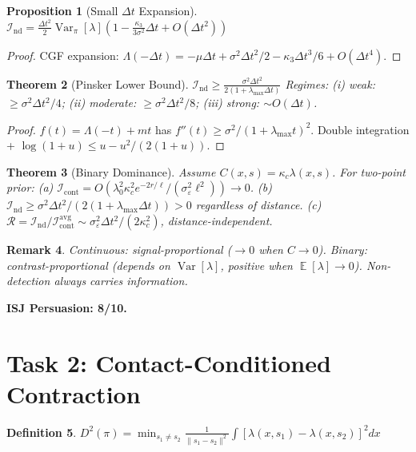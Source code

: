 \documentclass[11pt]{article}
\newtheorem{theorem}{Theorem}
\newtheorem{proposition}[theorem]{Proposition}
\newtheorem{definition}[theorem]{Definition}
\newtheorem{remark}[theorem]{Remark}
\DeclareMathOperator{\E}{\mathbb{E}}
\DeclareMathOperator{\Var}{\mathrm{Var}}
\begin{document}
\begin{proposition}[Small $\Delta t$ Expansion]\label{prop:small_dt}
$\mathcal{I}_{\mathrm{nd}}=\frac{\Delta t^2}{2}\Var_\pi[\lambda](1-\frac{\kappa_3}{3\sigma^2}\Delta t+O(\Delta t^2))$
\end{proposition}
\begin{proof}
CGF expansion: $\Lambda(-\Delta t)=-\mu\Delta t+\sigma^2\Delta t^2/2-\kappa_3\Delta t^3/6+O(\Delta t^4)$.
\end{proof}

\begin{theorem}[Pinsker Lower Bound]\label{thm:pinsker}
$\mathcal{I}_{\mathrm{nd}}\geq\frac{\sigma^2\Delta t^2}{2(1+\lambda_{\max}\Delta t)}$
Regimes: (i) weak: $\geq\sigma^2\Delta t^2/4$; (ii) moderate: $\geq\sigma^2\Delta t^2/8$; (iii) strong: $\sim O(\Delta t)$.
\end{theorem}
\begin{proof}
$f(t)=\Lambda(-t)+mt$ has $f''(t)\geq\sigma^2/(1+\lambda_{\max}t)^2$. Double integration + $\log(1+u)\leq u-u^2/(2(1+u))$.
\end{proof}

\begin{theorem}[Binary Dominance]\label{thm:binary_dominance}
Assume $C(x,s)=\kappa_c\lambda(x,s)$. For two-point prior:
(a) $\mathcal{I}_{\mathrm{cont}}=O(\lambda_0^2\kappa_c^2 e^{-2r/\ell}/(\sigma_\varepsilon^2\ell^2))\to 0$.
(b) $\mathcal{I}_{\mathrm{nd}}\geq\sigma^2\Delta t^2/(2(1+\lambda_{\max}\Delta t))>0$ regardless of distance.
(c) $\mathcal{R}=\mathcal{I}_{\mathrm{nd}}/\mathcal{I}_{\mathrm{cont}}^{\mathrm{avg}}\sim\sigma_\varepsilon^2\Delta t^2/(2\kappa_c^2)$, distance-independent.
\end{theorem}
\begin{remark}
Continuous: signal-proportional ($\to 0$ when $C\to 0$). Binary: contrast-proportional (depends on $\Var[\lambda]$, positive when $\E[\lambda]\to 0$). Non-detection always carries information.
\end{remark}

\medskip\noindent\textbf{ISJ Persuasion: 8/10.}

\newpage
\section{Task 2: Contact-Conditioned Contraction}

\begin{definition}
$D^2(\pi)=\min_{s_1\neq s_2}\frac{1}{\|s_1-s_2\|^2}\int[\lambda(x,s_1)-\lambda(x,s_2)]^2dx$
\end{definition}
\end{document}
